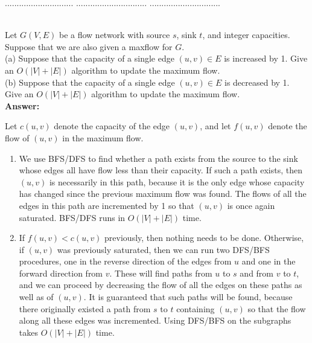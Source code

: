 \documentclass[a4paper,11pt]{article}
\begin{document}
\pagebreak

 $.............................$
 $..............................$
          $..............................$\\

\bigskip

\\
Let $G(V,E)$ be a flow network with source $s$, sink $t$, and integer capacities. Suppose that we are also given a maxflow for $G$.\\
(a) Suppose that the capacity of a single edge $(u,v) \in E$ is increased by 1. 
Give an $O(|V|+|E|)$ algorithm to update the maximum flow. \\
(b)  Suppose that the capacity of a single edge $(u,v) \in E$ is decreased by 1. 
Give an $O(|V|+|E|)$ algorithm to update the maximum flow. \\
{\bf Answer:} \par
Let $c(u, v)$ denote the capacity of the edge $(u, v)$, and let $f(u, v)$ denote the flow of $(u, v)$ in the maximum flow.
\begin{enumerate}[label=(\alph*)]
    \item
        We use BFS/DFS to find whether a path exists from the source to the sink whose edges all have flow less than their capacity. If such a path exists, then $(u, v)$ is necessarily in this path, because it is the only edge whose capacity has changed since the previous maximum flow was found. The flows of all the edges in this path are incremented by 1 so that $(u, v)$ is once again saturated. BFS/DFS runs in $O(|V| + |E|)$ time.

    \item
        If $f(u, v) < c(u, v)$ previously, then nothing needs to be done. Otherwise, if $(u, v)$ was previously saturated, then we can run two DFS/BFS procedures, one in the reverse direction of the edges from $u$ and one in the forward direction from $v$. These will find paths from $u$ to $s$ and from $v$ to $t$, and we can proceed by decreasing the flow of all the edges on these paths as well as of $(u, v)$. It is guaranteed that such paths will be found, because there originally existed a path from $s$ to $t$ containing $(u, v)$ so that the flow along all these edges was incremented. Using DFS/BFS on the subgraphs takes $O(|V| + |E|)$ time.

\end{enumerate}
\end{document}

